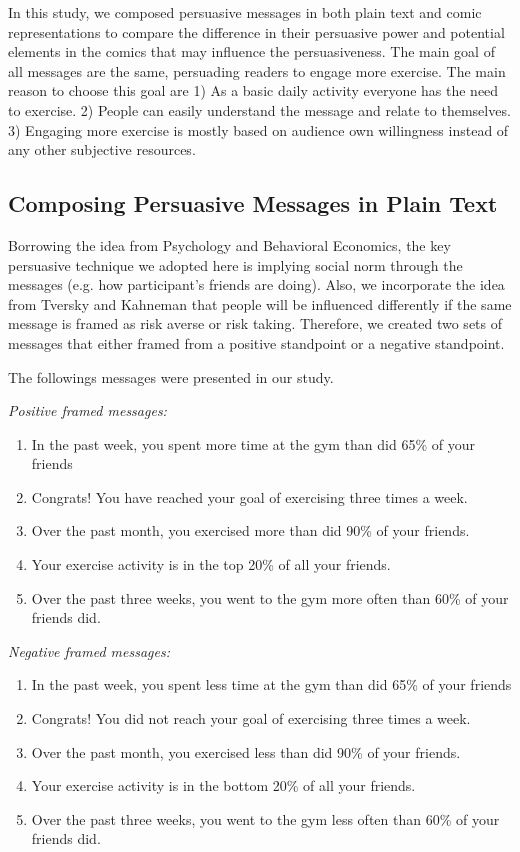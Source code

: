 In this study, we composed persuasive messages in both plain text and comic representations to compare the difference in their persuasive power and potential elements in the comics that may influence the persuasiveness. The main goal of all messages are the same, persuading readers to engage more exercise. The main reason to choose this goal are 1) As a basic daily activity everyone has the need to exercise. 2) People can easily understand the message and relate to themselves. 3) Engaging more exercise is mostly based on audience own willingness instead of any other subjective resources.\par
\subsection{Composing Persuasive Messages in Plain Text}
Borrowing the idea from Psychology and Behavioral Economics, the key persuasive technique we adopted here is implying social norm through the messages (e.g. how participant's friends are doing). Also, we incorporate the idea from Tversky and Kahneman that people will be influenced differently if the same message is framed as risk averse or risk taking. Therefore, we created two sets of messages that either framed from a positive standpoint or a negative standpoint. \par
The followings messages were presented in our study.\par
\textit{Positive framed messages:}
\begin{enumerate}
 \item In the past week, you spent more time at the gym than did 65\% of your friends
 \item Congrats! You have reached your goal of exercising three times a week.
 \item Over the past month, you exercised more than did 90\% of your friends.
 \item Your exercise activity is in the top 20\% of all your friends.
 \item Over the past three weeks, you went to the gym more often than 60\% of your friends did.
\end{enumerate}\par
\textit{Negative framed messages:}
\begin{enumerate}
 \item	In the past week, you spent less time at the gym than did 65\% of your friends
 \item Congrats! You did not reach your goal of exercising three times a week.
 \item	Over the past month, you exercised less than did 90\% of your friends.
 \item	Your exercise activity is in the bottom 20\% of all your friends.
 \item	Over the past three weeks, you went to the gym less often than 60\% of your friends did.
\end{enumerate}

